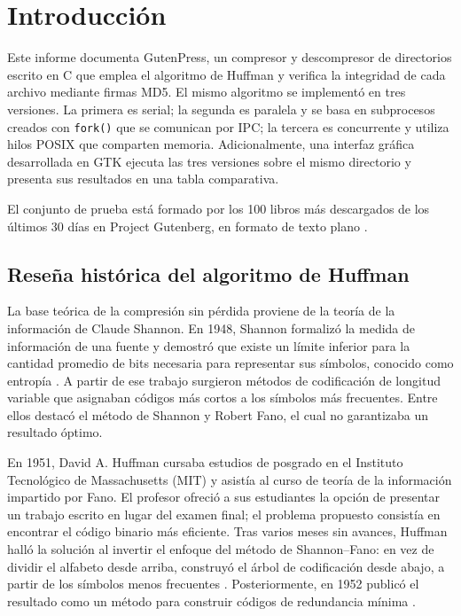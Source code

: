 \documentclass{report}
\begin{document}


\tableofcontents

\chapter{Introducción}\label{intro}

Este informe documenta GutenPress, un compresor y descompresor de directorios escrito en C que emplea el algoritmo de Huffman y verifica la integridad de cada archivo mediante firmas MD5. El mismo algoritmo se implementó en tres versiones. La primera es serial; la segunda es paralela y se basa en subprocesos creados con \texttt{fork()} que se comunican por IPC; la tercera es concurrente y utiliza hilos POSIX que comparten memoria. Adicionalmente, una interfaz gráfica desarrollada en GTK ejecuta las tres versiones sobre el mismo directorio y presenta sus resultados en una tabla comparativa.

El conjunto de prueba está formado por los 100 libros más descargados de los últimos 30 días en Project Gutenberg, en formato de texto plano \cite{gutenberg}.

\section{Reseña histórica del algoritmo de Huffman}\label{historia}

La base teórica de la compresión sin pérdida proviene de la teoría de la información de Claude Shannon. En 1948, Shannon formalizó la medida de información de una fuente y demostró que existe un límite inferior para la cantidad promedio de bits necesaria para representar sus símbolos, conocido como entropía \cite{shannon48}. A partir de ese trabajo surgieron métodos de codificación de longitud variable que asignaban códigos más cortos a los símbolos más frecuentes. Entre ellos destacó el método de Shannon y Robert Fano, el cual no garantizaba un resultado óptimo.

En 1951, David A. Huffman cursaba estudios de posgrado en el Instituto Tecnológico de Massachusetts (MIT) y asistía al curso de teoría de la información impartido por Fano. El profesor ofreció a sus estudiantes la opción de presentar un trabajo escrito en lugar del examen final; el problema propuesto consistía en encontrar el código binario más eficiente. Tras varios meses sin avances, Huffman halló la solución al invertir el enfoque del método de Shannon--Fano: en vez de dividir el alfabeto desde arriba, construyó el árbol de codificación desde abajo, a partir de los símbolos menos frecuentes \cite{stix91}. Posteriormente, en 1952 publicó el resultado como un método para construir códigos de redundancia mínima \cite{huffman52}.
\end{document}
